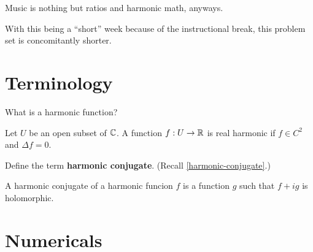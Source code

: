 \documentclass{homework}
\author{Alex Li}
\begin{document}
\maketitle

\begin{inspiration}
    Music is nothing but ratios and harmonic math, anyways.
    \end{inspiration}

    With this being a ``short'' week because of the instructional break,
    this problem set is concomitantly shorter.

    \section{Terminology}

    \begin{problem}
      What is a harmonic function?
      \end{problem}
      \begin{solution}
      Let $U$ be an open subset of $\mathbb{C}$. A function $f:U \to \mathbb{R}$ is real harmonic if $f\in C^2$ and $\Delta f = 0$.
      \end{solution}
      \begin{problem}
        Define the term \textbf{harmonic conjugate}.  (Recall \ref{harmonic-conjugate}.)
        \end{problem}
        \begin{solution}
        A harmonic conjugate of a harmonic funcion $f$ is a function $g$ such that $f+ig$ is holomorphic.
        \end{solution}

        \section{Numericals}
\end{document}
